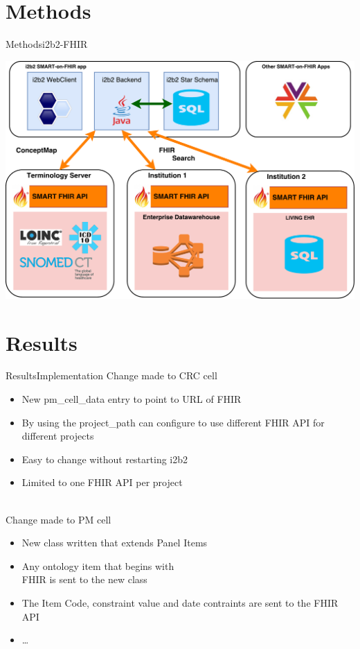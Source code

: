 \documentclass[10pt]{beamer}
\begin{document}
\section{Methods}
\begin{frame}{Methods}{i2b2-FHIR}

\includegraphics[height=.8\textheight]{images/overall.pdf}
\end{frame}

\section{Results}
\begin{frame}{Results}{Implementation}
	Change made to CRC cell
\begin{itemize}
\item New	pm\_cell\_data entry	to	point	to	URL of FHIR
\item By	using	the	project\_path can	configure	to	use	 different	FHIR	API	for	different	projects
\item Easy	to	change	without	restarting	i2b2
\item Limited	to	one	FHIR	API	per	project
\end{itemize}
~
\\
	Change made to PM cell
\begin{itemize}
\item New class written	that extends	Panel Items
\item Any ontology item that begins with \\FHIR is sent to the new class
\item The	Item	Code,	constraint	value	and	date	contraints are	sent	to	the	FHIR	API
\item \ldots
\end{itemize}
\end{frame}
\end{document}
